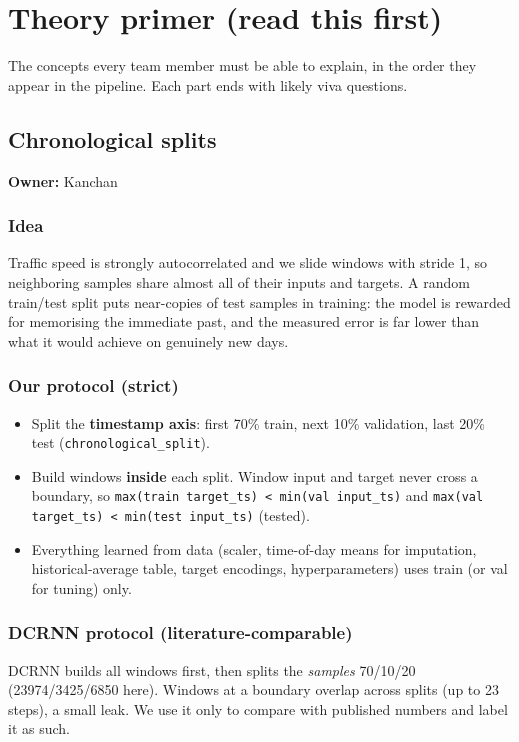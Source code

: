 \documentclass[10pt,a4paper]{article}
\begin{document}
\clearpage
\section*{Theory primer (read this first)}
The concepts every team member must be able to explain, in the order they appear in the pipeline. Each part ends with likely viva questions.

\subsection*{Chronological splits}
\textbf{Owner:} Kanchan

\subsubsection*{Idea}
Traffic speed is strongly autocorrelated and we slide windows with stride 1, so neighboring samples share almost all of their inputs and targets. A random train/\allowbreak{}test split puts near-copies of test samples in training: the model is rewarded for memorising the immediate past, and the measured error is far lower than what it would achieve on genuinely new days.

\subsubsection*{Our protocol (strict)}
\begin{itemize}[nosep,leftmargin=*]
\item Split the \textbf{timestamp axis}: first 70\% train, next 10\% validation, last 20\% test (\texttt{chronological\_\allowbreak{}split}).
\item Build windows \textbf{inside} each split. Window input and target never cross a boundary, so \texttt{max(train target\_\allowbreak{}ts) < min(val input\_\allowbreak{}ts)} and \texttt{max(val target\_\allowbreak{}ts) < min(test input\_\allowbreak{}ts)} (tested).
\item Everything learned from data (scaler, time-of-day means for imputation, historical-average table, target encodings, hyperparameters) uses train (or val for tuning) only.
\end{itemize}

\subsubsection*{DCRNN protocol (literature-comparable)}
DCRNN builds all windows first, then splits the \emph{samples} 70/\allowbreak{}10/\allowbreak{}20 (23974/\allowbreak{}3425/\allowbreak{}6850 here). Windows at a boundary overlap across splits (up to 23 steps), a small leak. We use it only to compare with published numbers and label it as such.
\end{document}
